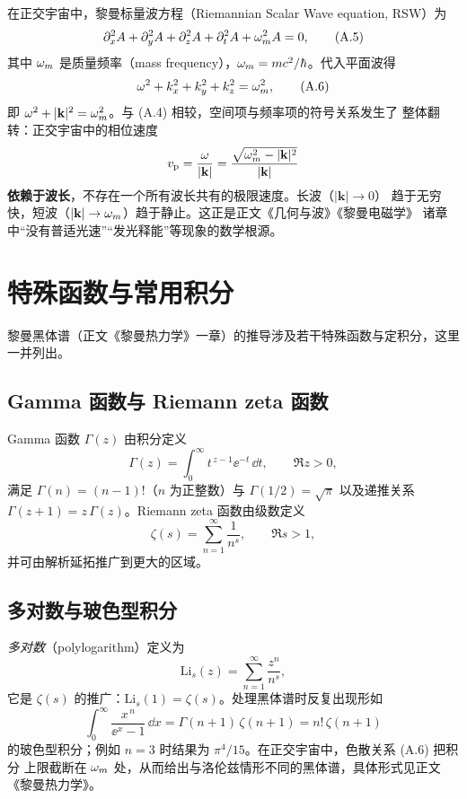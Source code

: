 在正交宇宙中，黎曼标量波方程（Riemannian Scalar Wave equation, RSW）为
\begin{equation}
\partial_x^{2}A+\partial_y^{2}A+\partial_z^{2}A+\partial_t^{2}A+\omega_m^{2}A=0 ,
\tag{A.5}
\end{equation}
其中 $\omega_m$ 是质量频率（mass frequency），$\omega_m=mc^{2}/\hbar$。代入平面波得
\begin{equation}
\omega^{2}+k_x^{2}+k_y^{2}+k_z^{2}=\omega_m^{2},
\tag{A.6}
\end{equation}
即 $\omega^{2}+|\mathbf{k}|^{2}=\omega_m^{2}$。与 (A.4) 相较，空间项与频率项的符号关系发生了
整体翻转：正交宇宙中的相位速度
\begin{equation}
v_{\mathrm p}=\frac{\omega}{|\mathbf{k}|}=\frac{\sqrt{\omega_m^{2}-|\mathbf{k}|^{2}}}{|\mathbf{k}|}
\end{equation}
\textbf{依赖于波长}，不存在一个所有波长共有的极限速度。长波（$|\mathbf{k}|\to 0$）
趋于无穷快，短波（$|\mathbf{k}|\to \omega_m$）趋于静止。这正是正文《几何与波》《黎曼电磁学》
诸章中“没有普适光速”“发光释能”等现象的数学根源。

\section{特殊函数与常用积分}

黎曼黑体谱（正文《黎曼热力学》一章）的推导涉及若干特殊函数与定积分，这里一并列出。

\subsection{Gamma 函数与 Riemann zeta 函数}

Gamma 函数 $\Gamma(z)$ 由积分定义
\begin{equation}
\Gamma(z)=\int_{0}^{\infty} t^{\,z-1}\ee^{-t}\,\dd t ,\qquad \Re z>0 ,
\end{equation}
满足 $\Gamma(n)=(n-1)!$（$n$ 为正整数）与 $\Gamma(1/2)=\sqrt{\pi}$ 以及递推关系
$\Gamma(z+1)=z\,\Gamma(z)$。Riemann zeta 函数由级数定义
\begin{equation}
\zeta(s)=\sum_{n=1}^{\infty}\frac{1}{n^{s}},\qquad \Re s>1 ,
\end{equation}
并可由解析延拓推广到更大的区域。

\subsection{多对数与玻色型积分}

\emph{多对数}（polylogarithm）定义为
\begin{equation}
\mathrm{Li}_s(z)=\sum_{n=1}^{\infty}\frac{z^{n}}{n^{s}},
\end{equation}
它是 $\zeta(s)$ 的推广：$\mathrm{Li}_s(1)=\zeta(s)$。处理黑体谱时反复出现形如
\begin{equation}
\int_{0}^{\infty}\frac{x^{\,n}}{\ee^{x}-1}\,\dd x=\Gamma(n+1)\,\zeta(n+1)=n!\,\zeta(n+1)
\end{equation}
的玻色型积分；例如 $n=3$ 时结果为 $\pi^{4}/15$。在正交宇宙中，色散关系 (A.6) 把积分
上限截断在 $\omega_m$ 处，从而给出与洛伦兹情形不同的黑体谱，具体形式见正文《黎曼热力学》。

